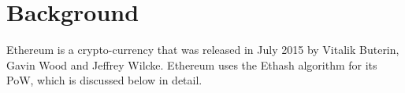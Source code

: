 \documentclass[runningheads]{llncs}
\newcommand{\trishita}[1]{{\color{magenta}\bfseries[Trishita: #1]}}
\begin{document}

\section{Background}
Ethereum is a crypto-currency that was released in July 2015 by Vitalik Buterin, Gavin Wood and Jeffrey Wilcke. Ethereum uses the Ethash algorithm for its PoW, which is discussed below in detail. 
\end{document}
